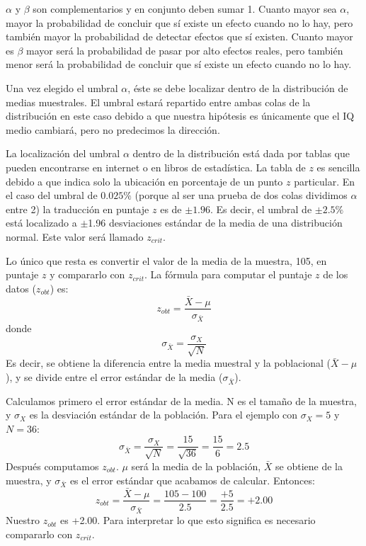 \documentclass[a4paper,12pt]{article}
\begin{document}
$\alpha$ y $\beta$ son complementarios y en conjunto deben sumar 1. Cuanto mayor sea $\alpha$, mayor la probabilidad de concluir que sí existe un efecto cuando no lo hay, pero también mayor la probabilidad de detectar efectos que sí existen. Cuanto mayor es $\beta$ mayor será la probabilidad de pasar por alto efectos reales, pero también menor será la probabilidad de concluir que sí existe un efecto cuando no lo hay.

Una vez elegido el umbral $\alpha$, éste se debe localizar dentro de la distribución de medias muestrales. El umbral estará repartido entre ambas colas de la distribución en este caso debido a que nuestra hipótesis es únicamente que el IQ medio cambiará, pero no predecimos la dirección.

La localización del umbral $\alpha$ dentro de la distribución está dada por tablas que pueden encontrarse en internet o en libros de estadística. La tabla de $z$ es sencilla debido a que indica solo la ubicación en porcentaje de un punto $z$ particular. En el caso del umbral de $0{.}025\%$ (porque al ser una prueba de dos colas dividimos $\alpha$ entre 2) la traducción en puntaje $z$ es de $\pm 1.96$. Es decir, el umbral de $\pm 2{.}5\%$ está localizado a $\pm$1.96 desviaciones estándar de la media de una distribución normal. Este valor será llamado $z_{crit}$.

Lo único que resta es convertir el valor de la media de la muestra, 105, en puntaje $z$ y compararlo con $z_{crit}$. La fórmula para computar el puntaje $z$ de los datos ($z_{obt}$) es:
\[
  z_{obt} = \frac{
    \bar{X} - \mu
  }{
    \sigma_{\bar{X}}
  }
\]
donde
\[
  \sigma_{\bar{X}} = \frac{
    \sigma_{X}
  }{
    \sqrt{N}
  }
\]
Es decir, se obtiene la diferencia entre la media muestral y la poblacional ($\bar{X} - \mu$), y se divide entre el error estándar de la media ($\sigma_{\bar{X}}$).

Calculamos primero el error estándar de la media. N es el tamaño de la muestra, y $\sigma_{X}$ es la desviación estándar de la población. Para el ejemplo con $\sigma_X = 5$ y $N = 36$:
\[
  \sigma_{\bar{X}} = \frac{
    \sigma_{X}
  }{
    \sqrt{N}
  } = \frac{
    15
  }{
    \sqrt{36}
  } = \frac{
    15
  }{
    6
  } = 2{.}5
\]
Después computamos $z_{obt}$. $\mu$ será la media de la población, $\bar{X}$ se obtiene de la muestra, y $\sigma_{\bar{X}}$ es el error estándar que acabamos de calcular. Entonces:
\[
  z_{obt} = \frac{
    \bar{X} - \mu
  }{
    \sigma_{\bar{X}}
  } = \frac{
    105 - 100
  }{
    2{.}5
  } = \frac{
    +5
  }{
    2{.}5
  } = +2{.}00
\]
Nuestro $z_{obt}$ es +2.00. Para interpretar lo que esto significa es necesario compararlo con $z_{crit}$.
\end{document}

